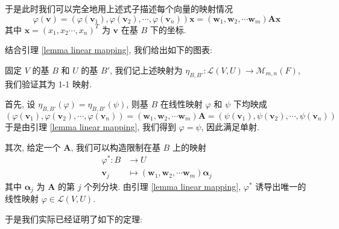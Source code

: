 \documentclass[UTF8]{book}
\begin{document}
于是此时我们可以完全地用上述式子描述每个向量的映射情况 
$$ \varphi(\boldsymbol{v}) = 
(\varphi(\boldsymbol{v}_1),\varphi(\boldsymbol{v}_2),\cdots,
\varphi(\boldsymbol{v}_n)) \boldsymbol{x} = 
 (\boldsymbol{w}_1,\boldsymbol{w}_2,
\cdots\boldsymbol{w}_m)\boldsymbol{Ax}$$
其中 $\boldsymbol{x} = (x_1,x_2\cdots,x_n)^T$ 为 $\boldsymbol{v}$ 
在基 $B$ 下的坐标. 

结合引理 \ref{lemma linear mapping}, 我们给出如下的图表: 

\begin{center}
\end{center}

固定 $V$ 的基 $B$ 和 $U$ 的基 $B'$, 
我们记上述映射为 
$\eta_{B,B'}: \mathcal{L}(V,U) \to \mathcal{M}_{m,n}(F)$, 
我们验证其为 1-1 映射. 

首先, 设 $\eta_{B,B'}(\varphi) = \eta_{B,B'}(\psi)$, 
则基 $B$ 在线性映射 $\varphi$ 和 $\psi$ 下均映成
$$ (\varphi(\boldsymbol{v}_1),\varphi(\boldsymbol{v}_2),\cdots,
\varphi(\boldsymbol{v}_n)) = (\boldsymbol{w}_1,\boldsymbol{w}_2,
\cdots\boldsymbol{w}_m)\boldsymbol{A} 
=  (\psi(\boldsymbol{v}_1),\psi(\boldsymbol{v}_2),\cdots,
\psi(\boldsymbol{v}_n))$$
于是由引理 \ref{lemma linear mapping}, 
我们得到 $\varphi = \psi$, 因此满足单射. 

其次, 给定一个 $\boldsymbol{A}$, 我们可以构造限制在基 $B$ 上的映射 
$$ \begin{aligned} 
\varphi^*: B & \to U \\
\boldsymbol{v}_j &\mapsto  (\boldsymbol{w}_1,\boldsymbol{w}_2,
\cdots\boldsymbol{w}_m)\boldsymbol{\alpha}_j
\end{aligned} $$
其中 $\boldsymbol{\alpha}_j$ 为 $\boldsymbol{A}$ 的第 $j$ 个列分块. 
由引理 \ref{lemma linear mapping}, $\varphi^*$ 诱导出唯一的线性映射 
$\varphi \in \mathcal{L}(V,U)$. 

于是我们实际已经证明了如下的定理: 
\end{document}
